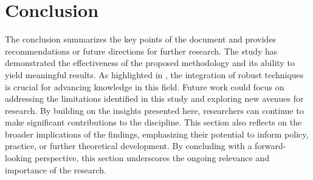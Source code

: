     \section{Conclusion}
    The conclusion summarizes the key points of the document and provides recommendations or future directions for further research. The study has demonstrated the effectiveness of the proposed methodology and its ability to yield meaningful results. As highlighted in \cite{sample2023}, the integration of robust techniques is crucial for advancing knowledge in this field. Future work could focus on addressing the limitations identified in this study and exploring new avenues for research. By building on the insights presented here, researchers can continue to make significant contributions to the discipline. This section also reflects on the broader implications of the findings, emphasizing their potential to inform policy, practice, or further theoretical development. By concluding with a forward-looking perspective, this section underscores the ongoing relevance and importance of the research.
    